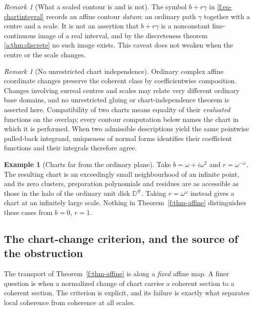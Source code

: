 \documentclass[11pt,a4paper]{article}
\numberwithin{equation}{section}
\theoremstyle{definition}
\newtheorem{example}[theorem]{Example}
\theoremstyle{remark}
\newtheorem{remark}[theorem]{Remark}
\theoremstyle{plain}
\newcommand{\halo}[1]{#1^{\#}}
\begin{document}
\begin{remark}[What a scaled contour is and is not]\label{f:rem-chartpath}
The symbol $b+r\gamma$ in \eqref{f:eq-chartintegral} records an affine
contour \emph{datum}: an ordinary path $\gamma$ together with a centre
and a scale.  It is not an assertion that $b+r\gamma$ is a nonconstant
fine-continuous image of a real interval, and by the discreteness
theorem \ref{a:thm:discrete} no such image exists.  This caveat does not
weaken when the centre or the scale changes.
\end{remark}

\begin{remark}[No unrestricted chart independence]\label{f:rem-nogluing}
Ordinary complex affine coordinate changes preserve the coherent class
by coefficientwise composition.  Changes involving surreal centres and
scales may relate very different ordinary base domains, and no
unrestricted gluing or chart-independence theorem is asserted here.
Compatibility of two charts means equality of their \emph{evaluated}
functions on the overlap; every contour computation below names the
chart in which it is performed.  When two admissible descriptions yield
the same pointwise pulled-back integrand, uniqueness of normal forms
identifies their coefficient functions and their integrals therefore
agree.
\end{remark}

\begin{example}[Charts far from the ordinary plane]\label{f:ex-farchart}
Take $b=\omega+i\omega^{2}$ and $r=\omega^{-\omega}$.  The resulting
chart is an exceedingly small neighbourhood of an infinite point, and
its zero clusters, preparation polynomials and residues are as
accessible as those in the halo of the ordinary unit disk
$\halo{\mathbb D}$.  Taking $r=\omega^{\omega}$ instead gives a chart at
an infinitely large scale.  Nothing in Theorem~\ref{f:thm-affine}
distinguishes these cases from $b=0$, $r=1$.
\end{example}

\subsection{The chart-change criterion, and the source of the
obstruction}\label{f:sub-chartchange}

The transport of Theorem~\ref{f:thm-affine} is along a \emph{fixed}
affine map.  A finer question is when a normalized change of chart
carries a coherent section to a coherent section.  The criterion is
explicit, and its failure is exactly what separates local coherence from
coherence at all scales.
\end{document}
